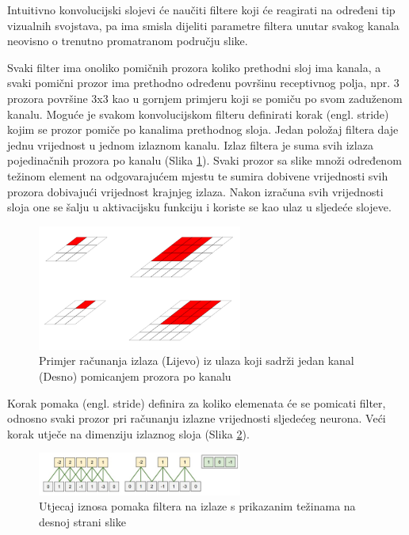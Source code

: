 \documentclass[times, utf8, proizvoljni, numeric]{fer}
\begin{document}
Intuitivno konvolucijski slojevi će naučiti filtere koji će reagirati na određeni tip vizualnih svojstava, pa ima smisla dijeliti parametre filtera unutar svakog kanala neovisno o trenutno promatranom području slike.

Svaki filter ima onoliko pomičnih prozora koliko prethodni sloj ima kanala, a svaki pomični prozor ima prethodno određenu površinu receptivnog polja, npr. 3 prozora površine 3x3 kao u gornjem primjeru koji se pomiču po svom zaduženom kanalu. Moguće je svakom konvolucijskom filteru definirati korak (engl. stride) kojim se prozor pomiče po kanalima prethodnog sloja. Jedan položaj filtera daje jednu vrijednost u jednom izlaznom kanalu. Izlaz filtera je suma svih izlaza pojedinačnih prozora po kanalu (Slika \ref{fg:konvolucija}). Svaki prozor sa slike množi određenom težinom element na odgovarajućem mjestu te sumira dobivene vrijednosti svih prozora dobivajući vrijednost krajnjeg izlaza. Nakon izračuna svih vrijednosti sloja one se šalju u aktivacijsku funkciju i koriste se kao ulaz u sljedeće slojeve. 

\clearpage
\begin{figure}[!ht]
	\begin{center}
		\captionsetup{justification=centering}
		\includegraphics[width=0.6\textwidth]{./imgs/konvolucija.png}
		\caption{Primjer računanja izlaza (Lijevo) iz ulaza koji sadrži jedan kanal (Desno) pomicanjem prozora po kanalu \cite{DubokoUcenje}}
		\label{fg:konvolucija}
	\end{center}
\end{figure}

Korak pomaka (engl. stride) definira za koliko elemenata će se pomicati filter, odnosno svaki prozor pri računanju izlazne vrijednosti sljedećeg neurona. Veći korak utječe na dimenziju izlaznog sloja (Slika \ref{fg:pomak}).

\begin{figure}[!ht]
	\begin{center}
		\captionsetup{justification=centering}
		\includegraphics[width=0.6\textwidth]{./imgs/pomak.png}
		\caption{Utjecaj iznosa pomaka filtera na izlaze s prikazanim težinama na desnoj strani slike \cite{CS231n}}
		\label{fg:pomak}
	\end{center}
\end{figure}
\end{document}
